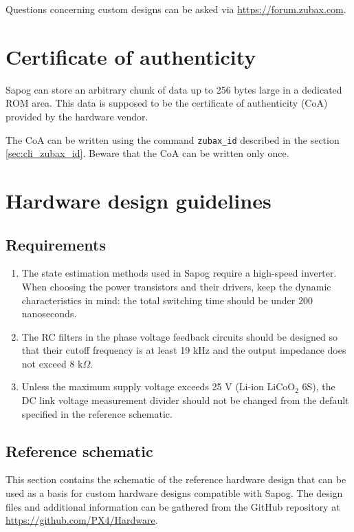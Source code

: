 \documentclass{zubaxdoc}
\begin{document}
Questions concerning custom designs can be asked via \url{https://forum.zubax.com}.

\section{Certificate of authenticity}

Sapog can store an arbitrary chunk of data up to 256 bytes large in a dedicated ROM area.
This data is supposed to be the certificate of authenticity (CoA) provided by the hardware vendor.

The CoA can be written using the command \verb|zubax_id| described in the section
\ref{sec:cli_zubax_id}.
Beware that the CoA can be written only once.

\section{Hardware design guidelines}

\subsection{Requirements}

\begin{enumerate}
	\item The state estimation methods used in Sapog require a high-speed inverter.
	When choosing the power transistors and their drivers, keep the dynamic characteristics in mind:
	the total switching time should be under 200 nanoseconds.
	
	\item The RC filters in the phase voltage feedback circuits should be designed so that their cutoff frequency
	is at least 19 kHz and the output impedance does not exceed 8 $\text{k}\Omega$.
	
	\item Unless the maximum supply voltage exceeds 25 V (Li-ion $\text{LiCoO}_2$ 6S),
	the DC link voltage measurement divider should not be changed from the default specified in
	the reference schematic.
\end{enumerate}

\subsection{Reference schematic}

This section contains the schematic of the reference hardware design that can be used as a basis for custom hardware
designs compatible with Sapog.
The design files and additional information can be gathered from the GitHub repository at
\url{https://github.com/PX4/Hardware}.
\end{document}
